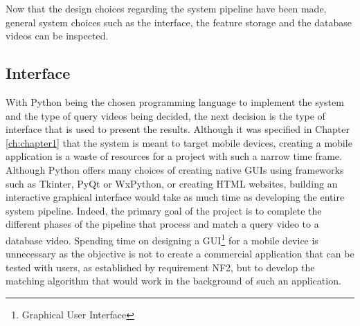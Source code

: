 Now that the design choices regarding the system pipeline have been made, general system choices such as the interface, the feature storage and the database videos can be inspected.


\subsection{Interface}

With Python being the chosen programming language to implement the system and the type of query videos being decided, the next decision is the type of interface that is used to present the results. Although it was specified in Chapter \ref{ch:chapter1} that the system is meant to target mobile devices, creating a mobile application is a waste of resources for a project with such a narrow time frame. Although Python offers many choices of creating native GUIs using frameworks such as Tkinter, PyQt or WxPython, or creating HTML websites, building an interactive graphical interface would take as much time as developing the entire system pipeline. Indeed, the primary goal of the project is to complete the different phases of the pipeline that process and match a query video to a database video. Spending time on designing a GUI\footnote{Graphical User Interface} for a mobile device is unnecessary as the objective is not to create a commercial application that can be tested with users, as established by requirement NF2, but to develop the matching algorithm that would work in the background of such an application.\\

